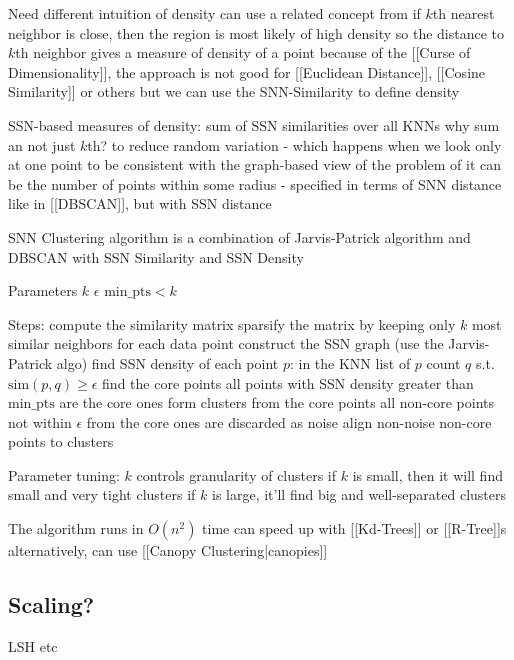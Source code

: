 Need different intuition of density
 can use a related concept from
 if $k$th nearest neighbor is close, then the region is most likely of high density
 so the distance to $k$th neighbor gives a measure of density of a point
 because of the [[Curse of Dimensionality]], the approach is not good for [[Euclidean Distance]], [[Cosine Similarity]] or others
 but we can use the SNN-Similarity to define density


SSN-based measures of density:
 sum of SSN similarities over all KNNs
 why sum an not just $k$th?
 to reduce random variation - which happens when we look only at one point
 to be consistent with the graph-based view of the problem
 of it can be the number of points within some radius - specified in terms of SNN distance
 like in [[DBSCAN]], but with SSN distance


SNN Clustering algorithm is a combination of
 Jarvis-Patrick algorithm and
 DBSCAN with SSN Similarity and SSN Density


Parameters
 $k$
 $\epsilon$
 $\text{min\_pts} < k$


Steps:
 compute the similarity matrix
 sparsify the matrix by keeping only $k$ most similar neighbors for each data point
 construct the SSN graph (use the Jarvis-Patrick algo)
 find SSN density of each point $p$:
 in the KNN list of $p$ count $q$ s.t. $\text{sim}(p, q) \geqslant \epsilon$
 find the core points
 all points with SSN density greater than $\text{min\_pts}$ are the core ones
 form clusters from the core points
 all non-core points not within $\epsilon$ from the core ones are discarded as noise
 align non-noise non-core points to clusters


Parameter tuning:
 $k$ controls granularity of clusters
 if $k$ is small, then it will find small and very tight clusters
 if $k$ is large, it'll find big and well-separated clusters


 The algorithm runs in $O(n^2)$ time
 can speed up with [[Kd-Trees]] or [[R-Tree]]s
 alternatively, can use [[Canopy Clustering|canopies]]


\subsection{Scaling?}

LSH etc
